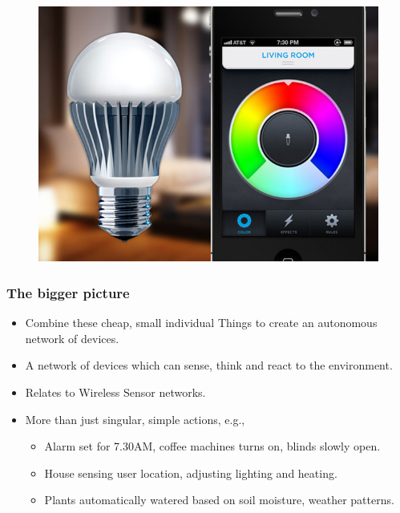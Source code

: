 \documentclass{beamer}
\begin{document}
\begin{frame}[t]
{\begin{figure}[htb]
\begin{minipage}{0.3\textwidth}
          \includegraphics[scale=0.1]{presentation/img/smart-light.jpg}
      \end{minipage}
    \end{figure}
}  \end{frame}

  \begin{frame}[t]\frametitle{The bigger picture}
  \begin{itemize}
    \item Combine these cheap, small individual Things to create an autonomous network of devices.
    \item A network of devices which can sense, think and react to the environment.
    \item Relates to Wireless Sensor networks.
    \item More than just singular, simple actions, e.g.,
    \begin{itemize}
      \item Alarm set for 7.30AM, coffee machines turns on, blinds slowly open.
      \item House sensing user location, adjusting lighting and heating.
      \item Plants automatically watered based on soil moisture, weather patterns. 
    \end{itemize}
  \end{itemize}
  \end{frame}
\end{document}
